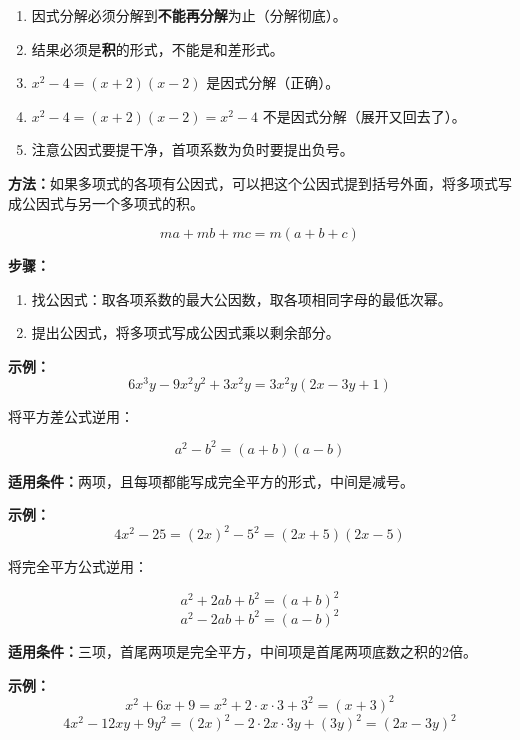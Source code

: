 \documentclass[12pt, a4paper]{ctexart}
\begin{document}
\begin{warnbox}
\begin{enumerate}[nosep]
  \item 因式分解必须分解到\textbf{不能再分解}为止（分解彻底）。
  \item 结果必须是\textbf{积}的形式，不能是和差形式。
  \item $x^2 - 4 = (x+2)(x-2)$ 是因式分解（正确）。
  \item $x^2 - 4 = (x+2)(x-2) = x^2 - 4$ 不是因式分解（展开又回去了）。
  \item 注意公因式要提干净，首项系数为负时要提出负号。
\end{enumerate}
\end{warnbox}

\begin{knowledgebox}[提公因式法]
\textbf{方法：}如果多项式的各项有公因式，可以把这个公因式提到括号外面，将多项式写成公因式与另一个多项式的积。

$$\boxed{ma + mb + mc = m(a + b + c)}$$

\textbf{步骤：}
\begin{enumerate}[nosep]
  \item 找公因式：取各项系数的最大公因数，取各项相同字母的最低次幂。
  \item 提出公因式，将多项式写成公因式乘以剩余部分。
\end{enumerate}

\textbf{示例：}
$$6x^3y - 9x^2y^2 + 3x^2y = 3x^2y(2x - 3y + 1)$$
\end{knowledgebox}

\begin{knowledgebox}
将平方差公式逆用：

$$\boxed{a^2 - b^2 = (a + b)(a - b)}$$

\textbf{适用条件：}两项，且每项都能写成完全平方的形式，中间是减号。

\textbf{示例：}
$$4x^2 - 25 = (2x)^2 - 5^2 = (2x+5)(2x-5)$$
\end{knowledgebox}

\begin{knowledgebox}
将完全平方公式逆用：

$$\boxed{a^2 + 2ab + b^2 = (a + b)^2}$$
$$\boxed{a^2 - 2ab + b^2 = (a - b)^2}$$

\textbf{适用条件：}三项，首尾两项是完全平方，中间项是首尾两项底数之积的$2$倍。

\textbf{示例：}
$$x^2 + 6x + 9 = x^2 + 2 \cdot x \cdot 3 + 3^2 = (x + 3)^2$$
$$4x^2 - 12xy + 9y^2 = (2x)^2 - 2 \cdot 2x \cdot 3y + (3y)^2 = (2x - 3y)^2$$
\end{knowledgebox}
\end{document}
